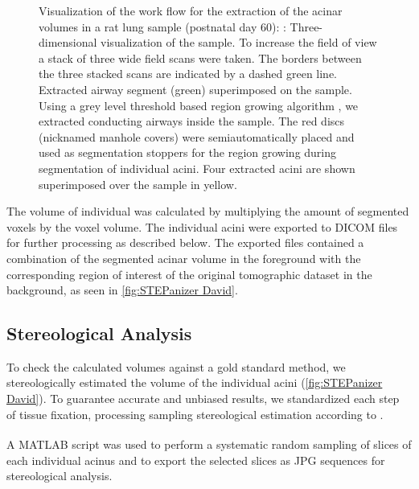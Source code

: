 \documentclass[final,paper=a4,DIV=calc,abstract,english]{scrartcl}
\newlength\imagescale		%
\begin{document}
\begin{figure}
{\begin{tikzpicture}[x=\imagescale,y=-\imagescale]
		\end{tikzpicture}%
		\label{subfig:extracted acini}%
		}%
	\caption{%
		Visualization of the work flow for the extraction of the acinar volumes in a rat lung sample (postnatal day 60): %
		\protect{}: Three-dimensional visualization of the sample.
		To increase the field of view a stack of three wide field scans were taken.
		The borders between the three stacked scans are indicated by a dashed green line.
		\protect{} Extracted airway segment (green) superimposed on the sample.
		Using a grey level threshold based region growing algorithm , we extracted conducting airways inside the sample.
		The red discs (nicknamed manhole covers) were semiautomatically placed and used as segmentation stoppers for the region growing during segmentation of individual acini.
		\protect{} Four extracted acini are shown superimposed over the sample in yellow.
	}
	\label{fig:workflow}
\end{figure}

The volume of  individual  was calculated by multiplying the amount of segmented voxels by the voxel volume.
The individual acini were exported to DICOM files for further processing as described below.
The exported files contained a combination of the segmented acinar volume in the foreground with the corresponding region of interest of the original tomographic dataset in the background, as seen in \autoref{fig:STEPanizer David}.

\subsection{Stereological Analysis}
\label{sec:stereological analysis}
To check the calculated volumes against a gold standard method, we stereologically estimated the volume of the individual acini (\autoref{fig:STEPanizer David}).
To guarantee accurate and unbiased results, we standardized each step of tissue fixation, processing  sampling stereological estimation  according to \citet{Hsia2010}.

A MATLAB\textsuperscript{\textregistered} script was used to perform a systematic random sampling of slices of each individual acinus and to export the selected slices as JPG sequences for stereological analysis.
\end{document}
